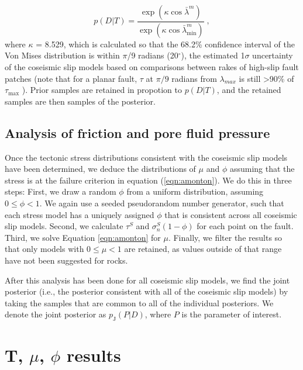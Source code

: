 \documentclass[draft,jgrga]{AGUTeX}
\begin{document}
\begin{article}
\begin{equation}
p (D | T) = \frac{ \exp ( \kappa \cos \bar{\lambda}^m )} 
{\exp (\kappa \cos \bar{\lambda}^m_{\min})} \;,
\label{eqn:rel_likelihood}
\end{equation}
where $\kappa$ = 8.529, which is calculated so that the 68.2\%
confidence interval of the Von Mises distribution is within $\pi$/9 radians
(20$^{\circ}$), the estimated 1$\sigma$ uncertainty of the coseismic
slip models based on comparisons between rakes of high-slip fault
patches (note that for a planar fault, $\tau$ at $\pi/9$ radians from
$\lambda_{max}$ is still \textgreater{}90\% of $\tau_{\mathrm{\max}}$
\citep{lisle2013}). Prior samples are retained in propotion to $p(D|T)$,
and the retained samples are then samples of the posterior.

\subsection{Analysis of friction and pore fluid
pressure}\label{analysis-of-friction-and-pore-fluid-pressure}

Once the tectonic stress distributions consistent with the coseismic
slip models have been determined, we deduce the distributions of $\mu$
and $\phi$ assuming that the stress is at the failure criterion in
equation (\ref{eqn:amonton}). We do this in three steps: First, we draw
a random $\phi$ from a uniform distribution, assuming $0 \leq \phi < 1$.
We again use a seeded pseudorandom number generator, such that each
stress model has a uniquely assigned $\phi$ that is consistent 
across all coseismic slip models. Second, we calculate $\tau^S$ and
$\sigma_n^S(1-\phi)$ for each point on the fault. Third, we solve
Equation \ref{eqn:amonton} for $\mu$. Finally, we filter the results so
that only models with $0 \le \mu < 1$ are retained, as values outside of
that range have not been suggested for rocks.

After this analysis has been done for all coseismic slip models, we find
the joint posterior (i.e., the posterior consistent with all of the
coseismic slip models) by taking the samples that are common to all of
the individual posteriors. We denote the joint posterior as
$p_{\mathrm{J}}(P | D)$, where $P$ is the parameter of interest.

\section{T, $\mu$, $\phi$ results}\label{t-mu-phi-results}


\end{article}
\end{document}
